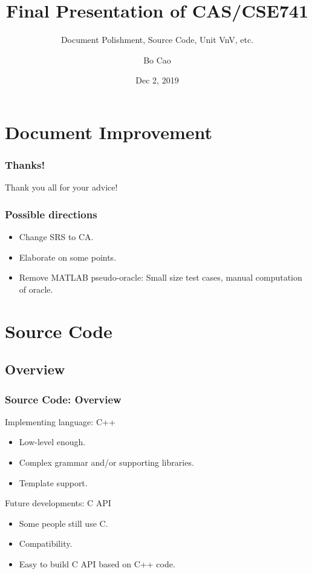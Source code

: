 \documentclass[12pt]{beamer}
\begin{document}
	\author{Bo Cao}
	\title{Final Presentation of CAS/CSE741}
	\subtitle{Document Polishment, Source Code, Unit VnV, etc.}
	\logo{}
	\date{Dec 2, 2019}
	
	\begin{frame}[plain]
	\maketitle
	\end{frame}

	\section{Document Improvement}
	
	\begin{frame}
		\frametitle{Thanks!}
		Thank you all for your advice!
	\end{frame}
	\begin{frame}
		\frametitle{Possible directions}
		\begin{itemize}
			\item Change SRS to CA.
			\item Elaborate on some points.
			\item Remove MATLAB pseudo-oracle: Small size test cases, manual computation of oracle.
		\end{itemize}
	\end{frame}

	\section{Source Code}
	\subsection{Overview}
	\begin{frame}
		\frametitle{Source Code: Overview}
		Implementing language: C++
		\begin{itemize}
			\item Low-level enough.
			\item Complex grammar and/or supporting libraries.
			\item Template support.
		\end{itemize}
		Future developments: C API
		\begin{itemize}
			\item Some people still use C.
			\item Compatibility.
			\item Easy to build C API based on C++ code.
		\end{itemize}
	\end{frame}
\end{document}

